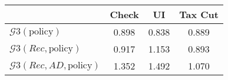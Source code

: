 \begin{tabular}{@{}lccc@{}}
\toprule
                          & Check      & UI    & Tax Cut    \\  \midrule
$\mathcal{G}3(\text{policy})$ & 0.898  & 0.838  & 0.889     \\
$\mathcal{G}3(Rec,\text{policy})$ & 0.917  & 1.153  & 0.893     \\
$\mathcal{G}3(Rec, AD,\text{policy})$ & 1.352  & 1.492  & 1.070     \\
\end{tabular}
